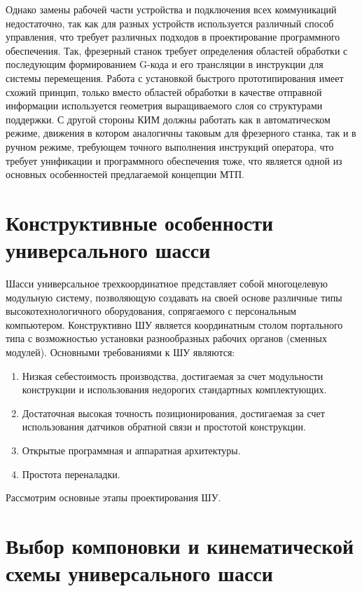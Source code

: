 Однако замены рабочей части устройства и подключения всех коммуникаций недостаточно, так как для разных устройств используется различный способ управления, что требует различных подходов в проектирование программного обеспечения. Так, фрезерный станок требует определения областей обработки с последующим формированием G-кода и его трансляции в инструкции для системы перемещения. Работа с установкой быстрого прототипирования имеет схожий принцип, только вместо областей обработки в качестве отправной информации используется геометрия выращиваемого слоя со структурами поддержки. С другой стороны КИМ должны работать как в автоматическом режиме, движения в котором аналогичны таковым для фрезерного станка, так и в ручном режиме, требующем точного выполнения инструкций оператора, что требует унификации и программного обеспечения тоже, что является одной из основных особенностей предлагаемой концепции МТП.

\section{Конструктивные особенности универсального шасси}

Шасси универсальное трехкоординатное представляет собой многоцелевую модульную систему, позволяющую создавать на своей основе различные типы высокотехнологичного оборудования, сопрягаемого с персональным компьютером. Конструктивно ШУ является координатным столом портального типа с возможностью установки разнообразных рабочих органов (сменных модулей). Основными требованиями к ШУ являются:

\begin{enumerate}
	\item Низкая себестоимость производства, достигаемая за счет модульности конструкции и использования недорогих стандартных комплектующих.
	
	\item Достаточная высокая точность позиционирования, достигаемая за счет использования датчиков обратной связи и простотой конструкции.
	
	\item Открытые программная и аппаратная архитектуры.
	
	\item Простота переналадки.
\end{enumerate}

Рассмотрим основные этапы проектирования ШУ.

\section{Выбор компоновки и кинематической схемы универсального шасси}

